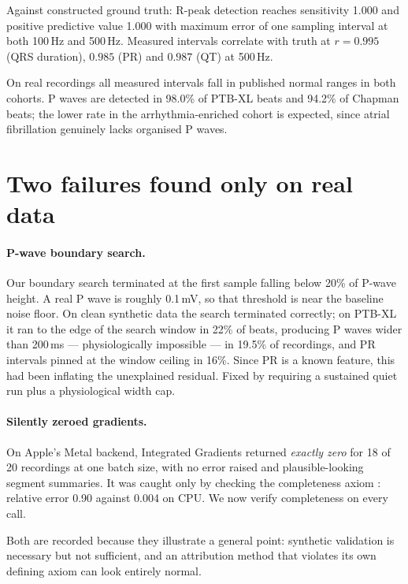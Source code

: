 \documentclass{article}
\begin{document}
Against constructed ground truth: R-peak detection reaches sensitivity 1.000 and
positive predictive value 1.000 with maximum error of one sampling interval at
both 100\,Hz and 500\,Hz. Measured intervals correlate with truth at
$r = 0.995$ (QRS duration), $0.985$ (PR) and $0.987$ (QT) at 500\,Hz.

On real recordings all measured intervals fall in published normal ranges in
both cohorts. P waves are detected in 98.0\% of PTB-XL beats and 94.2\% of
Chapman beats; the lower rate in the arrhythmia-enriched cohort is expected,
since atrial fibrillation genuinely lacks organised P waves.

\section{Two failures found only on real data}
\label{app:failures}

\paragraph{P-wave boundary search.} Our boundary search terminated at the first
sample falling below 20\% of P-wave height. A real P wave is roughly 0.1\,mV, so
that threshold is near the baseline noise floor. On clean synthetic data the
search terminated correctly; on PTB-XL it ran to the edge of the search window
in 22\% of beats, producing P waves wider than 200\,ms --- physiologically
impossible --- in 19.5\% of recordings, and PR intervals pinned at the window
ceiling in 16\%. Since PR is a known feature, this had been inflating the
unexplained residual. Fixed by requiring a sustained quiet run plus a
physiological width cap.

\paragraph{Silently zeroed gradients.} On Apple's Metal backend, Integrated
Gradients returned \emph{exactly zero} for 18 of 20 recordings at one batch size,
with no error raised and plausible-looking segment summaries. It was caught only
by checking the completeness axiom \citep{sundararajan2017ig}: relative error
0.90 against 0.004 on CPU. We now verify completeness on every call.

Both are recorded because they illustrate a general point: synthetic validation
is necessary but not sufficient, and an attribution method that violates its own
defining axiom can look entirely normal.
\end{document}
